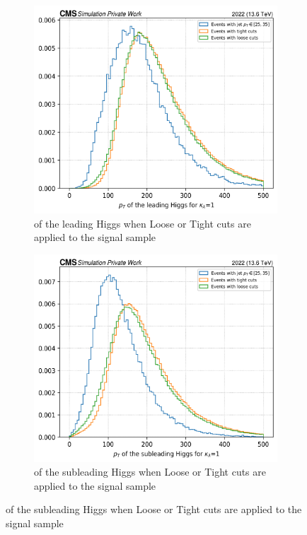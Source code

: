 \begin{figure}[h!]
    \centering
    \begin{subfigure}[b]{0.4\textwidth}
        \centering
        \includegraphics[width=\textwidth]{Images/4.HH4b Analysis/New events/pt h1.png}
        \caption{\pt of the leading Higgs when Loose or Tight cuts are applied to the signal sample}
        \label{fig: pt h1}
    \end{subfigure}
    \hfill
    \begin{subfigure}[b]{0.4\textwidth}
        \centering
        \includegraphics[width=\textwidth]{Images/4.HH4b Analysis/New events/pt h2.png}
        \caption{\pt of the subleading Higgs when Loose or Tight cuts are applied to the signal sample}
        \label{fig: pt h2}
    \end{subfigure}


\end{figure}
